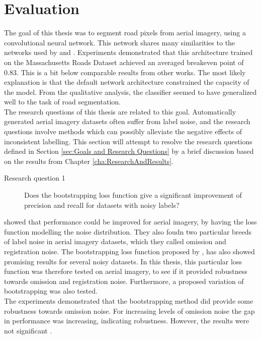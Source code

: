 \section{Evaluation}
\label{sec:SummaryDiscussion}
The goal of this thesis was to segment road pixels from aerial imagery, using a convolutional neural network. This network shares many similarities to the networks used by \cite{Mnih_aerial_images_noisy} and \citep{MnihThesis}. Experiments demonstrated that this architecture trained on the Massachusetts Roads Dataset achieved an averaged breakeven point of 0.83. This is a bit below comparable results from other works. The most likely explanation is that the default network architecture constrained the capacity of the model. From the qualitative analysis, the classifier seemed to have generalized well to the task of road segmentation.\\

 The research questions of this thesis are related to this goal. Automatically generated aerial imagery datasets often suffer from label noise, and the research questions involve methods which can possibly alleviate the negative effects of inconsistent labelling. This section will attempt to resolve the research questions defined in Section \ref{sec:Goals and Research Questions} by a brief discussion based on the results from Chapter \ref{cha:ResearchAndResults}.\\
\begin{description}
\item[Research question 1] Does the bootstrapping loss function give a significant improvement of precision and recall for datasets with noisy labels?
\end{description}

\cite{Mnih_aerial_images_noisy} showed that performance could be improved for aerial imagery, by having the loss function modelling the noise distribution. They also foudn two particular breeds of label noise in aerial imagery datasets, which they called omission and registration noise. The bootstrapping loss function proposed by \cite{Reed_noisy_labels_bootstrapping}, has also showed promising results for several noisy datasets. In this thesis, this particular loss function was therefore tested on aerial imagery, to see if it provided robustness towards omission and registration noise. Furthermore, a proposed variation of bootstrapping was also tested.\\

The experiments demonstrated that the bootstrapping method did provide some robustness towards omission noise. For increasing levels of omission noise the gap in performance was increasing, indicating robustness. However, the results were not significant .\\


